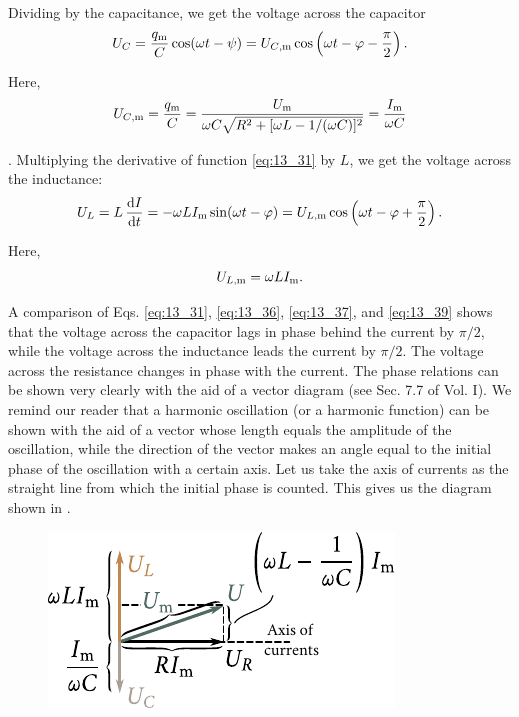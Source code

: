 \noindent
Dividing  by the capacitance, we get the voltage across the capacitor
\begin{equation}\label{eq:13_37}
    U_C = \frac{q_{\text{m}}}{C} \cos(\omega t - \psi) = U_{\text{$C$,m}} \cos\left(\omega t - \varphi - \frac{\pi}{2}\right).
\end{equation}

\noindent
Here,
\begin{equation}\label{eq:13_38}
    U_{\text{$C$,m}} = \frac{q_{\text{m}}}{C}  = \frac{U_{\text{m}}}{\omega C \sqrt{R^2 + [\omega L - 1/(\omega C)]^2}} = \frac{I_{\text{m}}}{\omega C}
\end{equation}

.
Multiplying the derivative of function \eqref{eq:13_31} by $L$, we get the voltage across the inductance:
\begin{equation}\label{eq:13_39}
    U_L = L\, \dfrac{\mathrm{d} I}{\mathrm{d} t} = - \omega L I_{\text{m}} \sin(\omega t - \varphi) = U_{\text{$L$,m}} \cos\left(\omega t - \varphi + \frac{\pi}{2}\right).
\end{equation}

\noindent
Here,
\begin{equation}\label{eq:13_40}
    U_{\text{$L$,m}} = \omega L I_{\text{m}}.
\end{equation}

A comparison of Eqs. \eqref{eq:13_31}, \eqref{eq:13_36}, \eqref{eq:13_37}, and \eqref{eq:13_39} shows that the voltage across the capacitor lags in phase behind the current by $\pi/2$, while the voltage across the inductance leads the current by $\pi/2$.
The voltage across the resistance changes in phase with the current.
The phase relations can be shown very clearly with the aid of a vector diagram (see Sec. 7.7 of Vol. I).
We remind our reader that a harmonic oscillation (or a harmonic function) can be shown with the aid of a vector whose length equals the amplitude of the oscillation, while the direction of the vector makes an angle equal to the initial phase of the oscillation with a certain axis.
Let us take the axis of currents as the straight line from which the initial phase is counted.
This gives us the diagram shown in .

\begin{figure}[t]
	\begin{center}
		\includegraphics[scale=1]{figures/ch_13/fig_13_6.pdf}
		\caption[]{}
		\label{fig:13_6}
	\end{center}
	\vspace{-0.8cm}
\end{figure}

